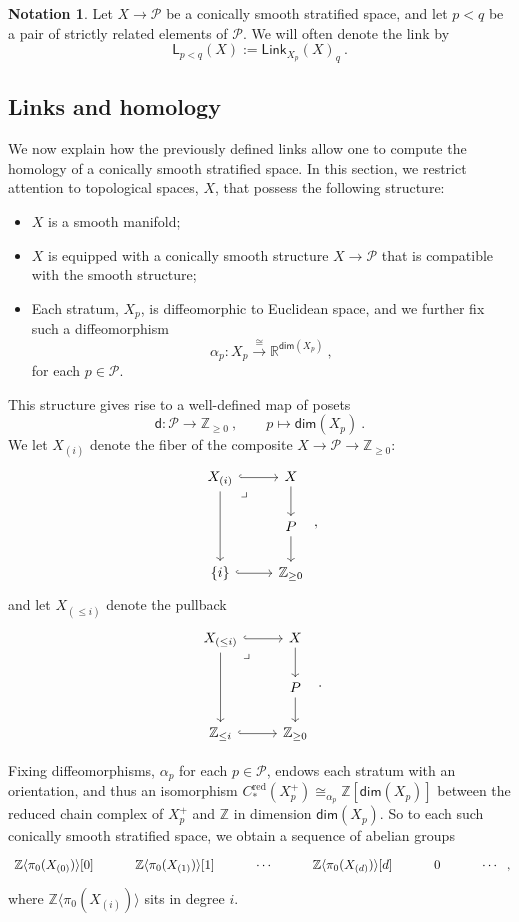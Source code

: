 \documentclass{article}
\newcommand{\bb}[1]{\mathbb{#1}}
\newcommand{\mc}[1]{\mathcal{#1}}
\newcommand{\msf}[1]{\mathsf{#1}}
\newcommand{\link}{\msf{Link}}
\renewcommand{\dim}{\msf{dim}}
\newcommand{\redc}{C^\text{red}}
\theoremstyle{definition}
\newtheorem{notation}[theorem]{Notation}
\begin{document}
\begin{notation}
    Let $X \to \mc{P}$ be a conically smooth stratified space, and let $p<q$ be a pair of strictly related elements of
    $\mc{P}$. We will often denote the link by
    $$\msf{L}_{p<q}(X) := \link_{X_p}(X)_q~.$$
\end{notation}



\subsection{Links and homology}
We now explain how the previously defined links allow one to compute the homology of a conically smooth 
stratified space.
In this section, we restrict attention to topological spaces, $X$, that possess the following structure:
\begin{itemize}
    \item $X$ is a smooth manifold;
    \item $X$ is equipped with a conically smooth structure $X \to \mc{P}$ that is compatible with the smooth
        structure;
    \item Each stratum, $X_p$, is diffeomorphic to Euclidean space, and we further fix such a diffeomorphism 
        $$\alpha_p:X_p \xrightarrow{\cong} \bb{R}^{\msf{dim}(X_p)}~,$$
        for each $p \in \mc{P}$.
\end{itemize}
This structure gives rise to a well-defined map of posets
$$\msf{d}:\mc{P} \to \bb{Z}_{\ge 0}~, \qquad p \mapsto \dim(X_p)~.$$
We let $X_{(i)}$ denote the fiber of the composite $X \to \mc{P} \to \bb{Z}_{\ge 0}$:
$$\begin{tikzcd}
        X_{(i)} \arrow[r,hook] \arrow[dd] \arrow[dr, phantom, "\lrcorner", very near start] & X \arrow[d] \\
        & P \arrow[d] \\
        \{i\} \arrow[r,hook] & \bb{Z}_{\ge 0}
    \end{tikzcd}~,$$
and let $X_{(\le i)}$ denote the pullback
$$\begin{tikzcd}
        X_{(\le i)} \arrow[r,hook] \arrow[dd] \arrow[dr, phantom, "\lrcorner", very near start] & X \arrow[d] \\
        & P \arrow[d] \\
        \bb{Z}_{\le i} \arrow[r,hook] & \bb{Z}_{\ge 0}
    \end{tikzcd}~.$$

Fixing diffeomorphisms, $\alpha_p$ for each $p \in \mc{P}$, endows each
stratum with an orientation, and thus an isomorphism $\redc_*(X_p^+) \cong_{\alpha_p} \bb{Z}[\dim(X_p)]$ between the reduced 
chain complex of $X_p^+$ and $\bb{Z}$ in dimension $\dim(X_p)$. So to each such 
conically smooth stratified space, we obtain a 
sequence of abelian groups
$$\begin{tikzcd}
    \bb{Z}\langle \pi_0(X_{(0)}) \rangle [0] & \bb{Z}\langle \pi_0(X_{(1)}) \rangle [1] & \cdots & \bb{Z}\langle \pi_0(X_{(d)})
        \rangle [d] & 0 & \cdots
    \end{tikzcd}~,$$
where $\bb{Z}\langle \pi_0(X_{(i)})\rangle$ sits in degree $i$. \\
\end{document}
